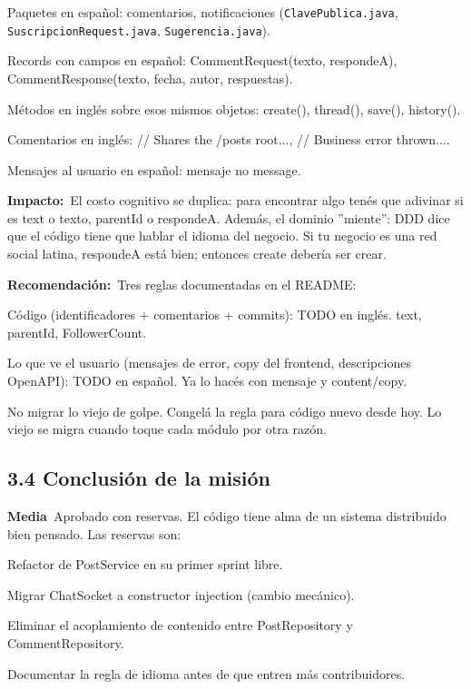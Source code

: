 \documentclass[10pt,a4paper]{article}
\newcommand{\code}[1]{\nolinkurl{#1}}
\newcommand{\badgeMedia}{\colorbox{yellow!35}{\textcolor{brown!90!black}{\textbf{\footnotesize Media}}}}
\begin{document}
Paquetes en español: comentarios, notificaciones (\code{ClavePublica.java}, \code{SuscripcionRequest.java}, \code{Sugerencia.java}).\par\vspace{0.4em}
Records con campos en español: CommentRequest(texto, respondeA), CommentResponse(texto, fecha, autor, respuestas).\par\vspace{0.4em}
Métodos en inglés sobre esos mismos objetos: create(), thread(), save(), history().\par\vspace{0.4em}
Comentarios en inglés: // Shares the /posts root..., // Business error thrown....\par\vspace{0.4em}
Mensajes al usuario en español: mensaje no message.\par\vspace{0.4em}
\noindent\textbf{Impacto:}\ El costo cognitivo se duplica: para encontrar algo tenés que adivinar si es text o texto, parentId o respondeA. Además, el dominio ''miente'': DDD dice que el código tiene que hablar el idioma del negocio. Si tu negocio es una red social latina, respondeA está bien; entonces create debería ser crear.\par\vspace{0.4em}
\noindent\textbf{Recomendación:}\ Tres reglas documentadas en el README:\par\vspace{0.4em}
Código (identificadores + comentarios + commits): TODO en inglés. text, parentId, FollowerCount.\par\vspace{0.4em}
Lo que ve el usuario (mensajes de error, copy del frontend, descripciones OpenAPI): TODO en español. Ya lo hacés con mensaje y content/copy.\par\vspace{0.4em}
No migrar lo viejo de golpe. Congelá la regla para código nuevo desde hoy. Lo viejo se migra cuando toque cada módulo por otra razón.\par\vspace{0.4em}
\subsection{3.4 Conclusión de la misión}
\badgeMedia\  Aprobado con reservas. El código tiene alma de un sistema distribuido bien pensado. Las reservas son:\par\vspace{0.4em}
Refactor de PostService en su primer sprint libre.\par\vspace{0.4em}
Migrar ChatSocket a constructor injection (cambio mecánico).\par\vspace{0.4em}
Eliminar el acoplamiento de contenido entre PostRepository y CommentRepository.\par\vspace{0.4em}
Documentar la regla de idioma antes de que entren más contribuidores.\par\vspace{0.4em}
\end{document}
